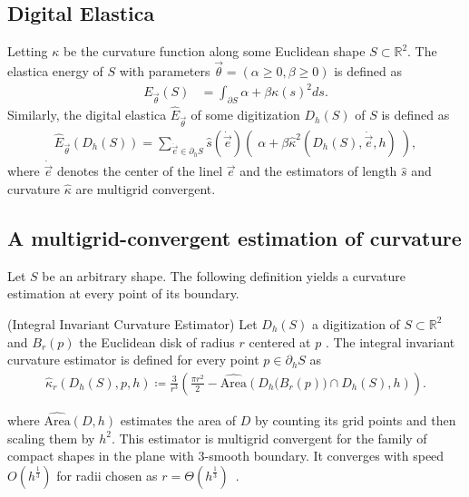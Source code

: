 \documentclass[runningheads]{llncs}
\newcommand{\daniel}[1]{ {\color{black}#1} }
\begin{document}
\subsection{Digital Elastica}
Letting $\kappa$ be the curvature function along some Euclidean shape
$S \subset \mathbb{R}^2$. The elastica energy of $S$ with parameters
$\vec{\theta}=(\alpha \geq 0, \beta \geq 0)$ is defined as
	\begin{align*}
	E_{\vec{\theta}}(S) &= \int_{\partial S}{ \alpha + \beta \kappa(s)^2 ds}.
	\end{align*}
Similarly, the digital elastica $\hat{E}_{\vec{\theta}}$ of some digitization $D_h(S)$ of $S$ is defined as
	\begin{align}
	\hat{E}_{\vec{\theta}}( D_h(S) ) = \sum_{\dot{\vec{e}} \in \partial_h S}{ \hat{s}( \dot{\vec{e}})\left(\; \alpha + \beta \hat{\kappa}^2(D_h(S),\dot{\vec{e}},h) \; \right)},
	\label{ch5:digital-elastica}
	\end{align}
where $\dot{\vec{e}}$ denotes the center of the linel $\vec{e}$ and the estimators of length $\hat{s}$ and
curvature $\hat{\kappa}$ are multigrid convergent.


\subsection{A multigrid-convergent estimation of curvature}    
Let $S$ be an arbitrary shape. The following definition yields a curvature estimation at every point of its boundary.

\begin{definition}{(Integral Invariant Curvature Estimator)}
  Let $D_h(S)$ a digitization of $S \subset \mathbb{R}^2$ \daniel{and $B_r(p)$ the Euclidean disk of radius $r$ centered at $p$}. The integral invariant curvature estimator is defined for
  every point $p \in \partial_h S$ as
  \begin{align}
    \hat{\kappa}_{r}(D_h(S),p,h) \coloneqq \frac{3}{r^3} \left( \frac{\pi r^2}{2} - \widehat{\text{Area}} \left( D_h\big( B_{r} ( p ) \big) \cap D_h(S), h \right) \right).
    \label{eq:curvature_approximation}
  \end{align}
\end{definition}
%
where $\widehat{\text{Area}}( D,h )$ estimates the area of $D$ by counting its grid points and then scaling them by
$h^2$. This estimator is multigrid convergent for the family of compact shapes in the plane with $3$-smooth boundary. It
converges with speed $O(h^\frac{1}{3})$ for radii chosen as $r=\Theta(h^\frac{1}{3})$~\cite{lachaud17robust}.
\end{document}
